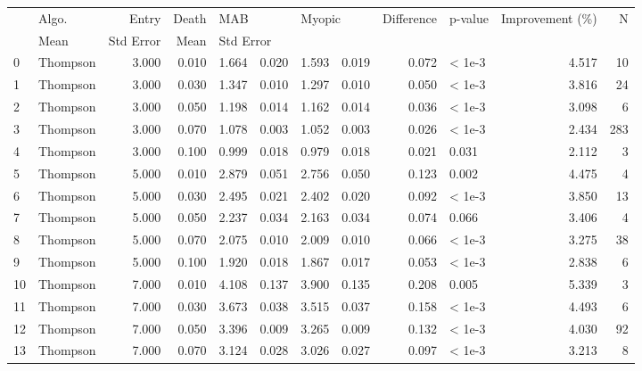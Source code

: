 \begin{tabular}{llrrrrrrrlrr}
\toprule
{} &     Algo. & Entry & Death & \multicolumn{2}{l}{MAB} & \multicolumn{2}{l}{Myopic} & Difference & p-value & Improvement (\%) &    N \\
{} &  Mean & Std Error &   Mean & \multicolumn{5}{l}{Std Error} \\
\midrule
0  &  Thompson & 3.000 & 0.010 & 1.664 &     0.020 &  1.593 &     0.019 &      0.072 &  < 1e-3 &           4.517 &   10 \\
1  &  Thompson & 3.000 & 0.030 & 1.347 &     0.010 &  1.297 &     0.010 &      0.050 &  < 1e-3 &           3.816 &   24 \\
2  &  Thompson & 3.000 & 0.050 & 1.198 &     0.014 &  1.162 &     0.014 &      0.036 &  < 1e-3 &           3.098 &    6 \\
3  &  Thompson & 3.000 & 0.070 & 1.078 &     0.003 &  1.052 &     0.003 &      0.026 &  < 1e-3 &           2.434 &  283 \\
4  &  Thompson & 3.000 & 0.100 & 0.999 &     0.018 &  0.979 &     0.018 &      0.021 &   0.031 &           2.112 &    3 \\
5  &  Thompson & 5.000 & 0.010 & 2.879 &     0.051 &  2.756 &     0.050 &      0.123 &   0.002 &           4.475 &    4 \\
6  &  Thompson & 5.000 & 0.030 & 2.495 &     0.021 &  2.402 &     0.020 &      0.092 &  < 1e-3 &           3.850 &   13 \\
7  &  Thompson & 5.000 & 0.050 & 2.237 &     0.034 &  2.163 &     0.034 &      0.074 &   0.066 &           3.406 &    4 \\
8  &  Thompson & 5.000 & 0.070 & 2.075 &     0.010 &  2.009 &     0.010 &      0.066 &  < 1e-3 &           3.275 &   38 \\
9  &  Thompson & 5.000 & 0.100 & 1.920 &     0.018 &  1.867 &     0.017 &      0.053 &  < 1e-3 &           2.838 &    6 \\
10 &  Thompson & 7.000 & 0.010 & 4.108 &     0.137 &  3.900 &     0.135 &      0.208 &   0.005 &           5.339 &    3 \\
11 &  Thompson & 7.000 & 0.030 & 3.673 &     0.038 &  3.515 &     0.037 &      0.158 &  < 1e-3 &           4.493 &    6 \\
12 &  Thompson & 7.000 & 0.050 & 3.396 &     0.009 &  3.265 &     0.009 &      0.132 &  < 1e-3 &           4.030 &   92 \\
13 &  Thompson & 7.000 & 0.070 & 3.124 &     0.028 &  3.026 &     0.027 &      0.097 &  < 1e-3 &           3.213 &    8 \\

\end{tabular}
